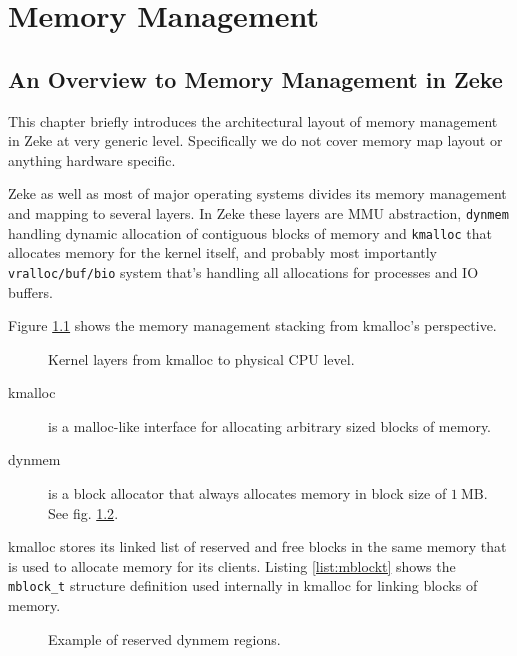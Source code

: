 \part{Memory Management}

\chapter{An Overview to Memory Management in Zeke}

This chapter briefly introduces the architectural layout of memory management
in Zeke at very generic level. Specifically we do not cover memory map layout or
anything hardware specific.

Zeke as well as most of major operating systems divides its memory management
and mapping to several layers. In Zeke these layers are \ac{MMU} abstraction,
\verb+dynmem+ handling dynamic allocation of contiguous blocks of memory and
\verb+kmalloc+ that allocates memory for the kernel itself, and probably most
importantly \verb+vralloc/buf/bio+ system that's handling all allocations for
processes and IO buffers.

Figure \ref{figure:mm_layers} shows the memory management stacking from kmalloc's
perspective.

\begin{figure}
  
  \centering
  \caption{Kernel layers from kmalloc to physical \acs{CPU} level.}
  \label{figure:mm_layers}
\end{figure}

\begin{description}
\item[kmalloc] is a malloc-like interface for allocating arbitrary sized blocks
  of memory.
\item[dynmem] is a block allocator that always allocates memory in block size of
  $1 \:\textrm{MB}$. See fig. \ref{figure:dynmem_blocks}.
\end{description}

kmalloc stores its linked list of reserved and free blocks in the same memory
that is used to allocate memory for its clients. Listing \ref{list:mblockt}
shows the \verb+mblock_t+ structure definition used internally in kmalloc for
linking blocks of memory.

\begin{figure}
  
  \centering
  \caption{Example of reserved dynmem regions.}
  \label{figure:dynmem_blocks}
\end{figure}







